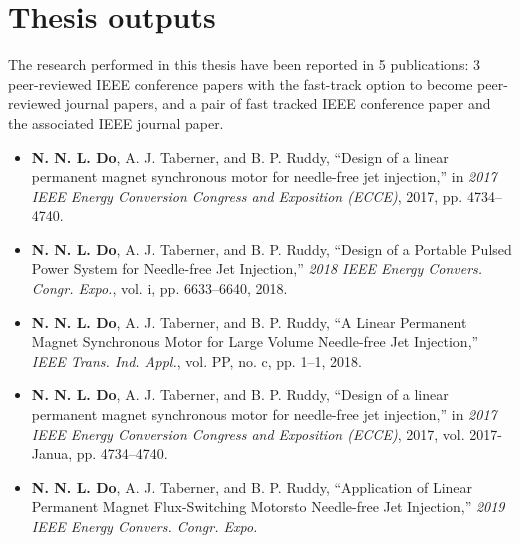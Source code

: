 \section{Thesis outputs}

The research performed in this thesis have been reported in 5 publications: 3 peer-reviewed IEEE conference papers with the fast-track option to become peer-reviewed journal papers, and a pair of fast tracked IEEE conference paper and the associated IEEE journal paper. 

\begin{itemize}
    \item \textbf{N. N. L. Do}, A. J. Taberner, and B. P. Ruddy, “Design of a linear permanent magnet synchronous motor for needle-free jet injection,” in \textit{2017 IEEE Energy Conversion Congress and Exposition (ECCE)}, 2017, pp. 4734–4740.
    \item \textbf{N. N. L. Do}, A. J. Taberner, and B. P. Ruddy, “Design of a Portable Pulsed Power System for Needle-free Jet Injection,” \textit{2018 IEEE Energy Convers. Congr. Expo.}, vol. i, pp. 6633–6640, 2018.
    \item \textbf{N. N. L. Do}, A. J. Taberner, and B. P. Ruddy, “A Linear Permanent Magnet Synchronous Motor for Large Volume Needle-free Jet Injection,” \textit{IEEE Trans. Ind. Appl.}, vol. PP, no. c, pp. 1–1, 2018.
    \item \textbf{N. N. L. Do}, A. J. Taberner, and B. P. Ruddy, “Design of a linear permanent magnet synchronous motor for needle-free jet injection,” in \textit{2017 IEEE Energy Conversion Congress and Exposition (ECCE)}, 2017, vol. 2017-Janua, pp. 4734–4740.
    \item \textbf{N. N. L. Do}, A. J. Taberner, and B. P. Ruddy, “Application of Linear Permanent Magnet Flux-Switching Motorsto Needle-free Jet Injection,” \textit{2019 IEEE Energy Convers. Congr. Expo.}
\end{itemize}